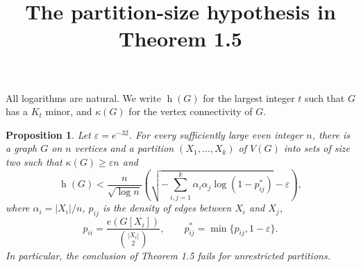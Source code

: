 \documentclass[11pt]{article}
\title{The partition-size hypothesis in Theorem 1.5}
\author{}
\date{}
\newtheorem{prop}{Proposition}
\DeclareMathOperator{\had}{h}
\newcommand{\eps}{\varepsilon}
\begin{document}
\maketitle

All logarithms are natural. We write $\had(G)$ for the largest integer $t$ such that $G$ has a $K_t$ minor, and $\kappa(G)$ for the vertex connectivity of $G$.

\begin{prop}
Let $\eps=e^{-32}$. For every sufficiently large even integer $n$, there is a graph $G$ on $n$ vertices and a partition $(X_1,\dots,X_k)$ of $V(G)$ into sets of size two such that $\kappa(G)\ge\eps n$ and
\[
 \had(G)<
 \frac{n}{\sqrt{\log n}}
 \left(
 \sqrt{-\sum_{i,j=1}^k\alpha_i\alpha_j\log(1-p_{ij}^*)}
 -\eps
 \right),
\]
where $\alpha_i=|X_i|/n$, $p_{ij}$ is the density of edges between $X_i$ and $X_j$,
\[
 p_{ii}=\frac{e(G[X_i])}{\binom{|X_i|}{2}},
 \qquad
 p_{ij}^*=\min\{p_{ij},1-\eps\}.
\]
In particular, the conclusion of Theorem 1.5 fails for unrestricted partitions.
\end{prop}
\end{document}
